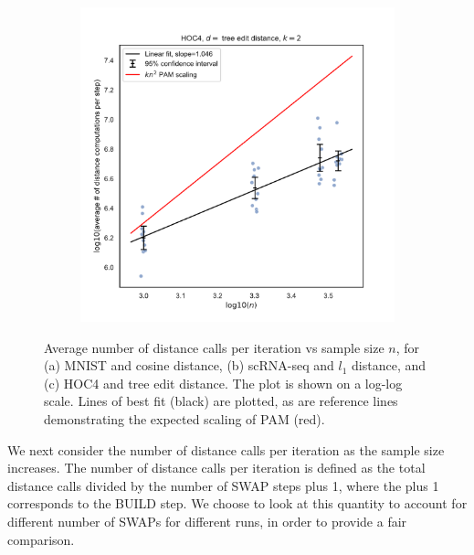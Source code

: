 \begin{figure}[ht]
\begin{subfigure}{.33\textwidth}
  \caption{}
  \label{fig:scaling2}
\end{subfigure}
\begin{subfigure}{.33\textwidth}
  \centering
  \includegraphics[width=\linewidth]{figures/HOC4-tree-k2.pdf}   
  \caption{}
  \label{fig:scaling3}
\end{subfigure}
\caption{Average number of distance calls per iteration vs sample size $n$, for (a) MNIST and cosine distance, (b) scRNA-seq and $l_1$ distance, and (c) HOC4 and tree edit distance. The plot is shown on a log-log scale. Lines of best fit (black) are plotted, as are reference lines demonstrating the expected scaling of PAM (red).}
\label{fig:scaling}
\end{figure}


We next consider the number of distance calls per iteration as the sample size increases. 
The number of distance calls per iteration is defined as the total distance calls divided by the number of SWAP steps plus 1, where the plus 1 corresponds to the BUILD step. We choose to look at this quantity to account for different number of SWAPs for different runs, in order to provide a fair comparison. 

